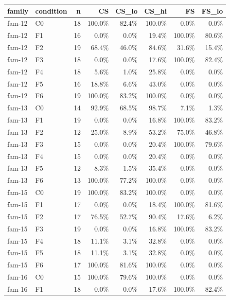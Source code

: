 \begin{tabular}{llrrrrrr}
\toprule
family & condition & n & CS & CS\_lo & CS\_hi & FS & FS\_lo \\
\midrule
fam-12 & C0 & 18 & 100.0\% & 82.4\% & 100.0\% & 0.0\% & 0.0\% \\
fam-12 & F1 & 16 & 0.0\% & 0.0\% & 19.4\% & 100.0\% & 80.6\% \\
fam-12 & F2 & 19 & 68.4\% & 46.0\% & 84.6\% & 31.6\% & 15.4\% \\
fam-12 & F3 & 18 & 0.0\% & 0.0\% & 17.6\% & 100.0\% & 82.4\% \\
fam-12 & F4 & 18 & 5.6\% & 1.0\% & 25.8\% & 0.0\% & 0.0\% \\
fam-12 & F5 & 16 & 18.8\% & 6.6\% & 43.0\% & 0.0\% & 0.0\% \\
fam-12 & F6 & 19 & 100.0\% & 83.2\% & 100.0\% & 0.0\% & 0.0\% \\
fam-13 & C0 & 14 & 92.9\% & 68.5\% & 98.7\% & 7.1\% & 1.3\% \\
fam-13 & F1 & 19 & 0.0\% & 0.0\% & 16.8\% & 100.0\% & 83.2\% \\
fam-13 & F2 & 12 & 25.0\% & 8.9\% & 53.2\% & 75.0\% & 46.8\% \\
fam-13 & F3 & 15 & 0.0\% & 0.0\% & 20.4\% & 100.0\% & 79.6\% \\
fam-13 & F4 & 15 & 0.0\% & 0.0\% & 20.4\% & 0.0\% & 0.0\% \\
fam-13 & F5 & 12 & 8.3\% & 1.5\% & 35.4\% & 0.0\% & 0.0\% \\
fam-13 & F6 & 13 & 100.0\% & 77.2\% & 100.0\% & 0.0\% & 0.0\% \\
fam-15 & C0 & 19 & 100.0\% & 83.2\% & 100.0\% & 0.0\% & 0.0\% \\
fam-15 & F1 & 17 & 0.0\% & 0.0\% & 18.4\% & 100.0\% & 81.6\% \\
fam-15 & F2 & 17 & 76.5\% & 52.7\% & 90.4\% & 17.6\% & 6.2\% \\
fam-15 & F3 & 19 & 0.0\% & 0.0\% & 16.8\% & 100.0\% & 83.2\% \\
fam-15 & F4 & 18 & 11.1\% & 3.1\% & 32.8\% & 0.0\% & 0.0\% \\
fam-15 & F5 & 18 & 11.1\% & 3.1\% & 32.8\% & 0.0\% & 0.0\% \\
fam-15 & F6 & 17 & 100.0\% & 81.6\% & 100.0\% & 0.0\% & 0.0\% \\
fam-16 & C0 & 15 & 100.0\% & 79.6\% & 100.0\% & 0.0\% & 0.0\% \\
fam-16 & F1 & 18 & 0.0\% & 0.0\% & 17.6\% & 100.0\% & 82.4\% \\

\end{tabular}
